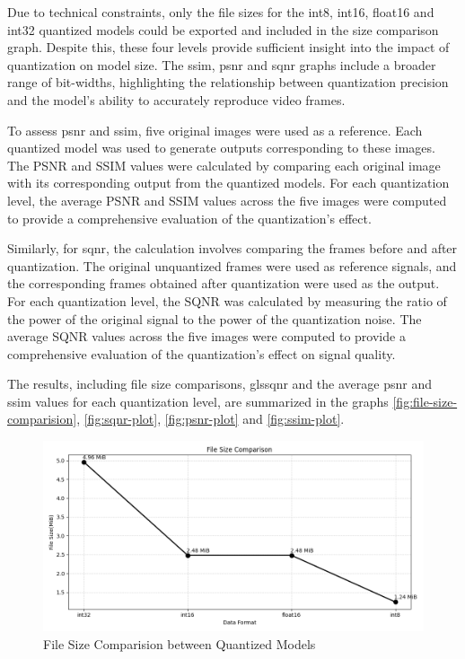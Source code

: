     Due to technical constraints, only the file sizes for the int8, int16, float16 and int32 quantized models could be exported and included in the size comparison graph. Despite this, these four levels provide sufficient insight into the impact of quantization on model size. The \gls{ssim}, \gls{psnr} and \gls{sqnr} graphs include a broader range of bit-widths, highlighting the relationship between quantization precision and the model's ability to accurately reproduce video frames.

    To assess \gls{psnr} and \gls{ssim}, five original images were used as a reference. Each quantized model was used to generate outputs corresponding to these images. The PSNR and SSIM values were calculated by comparing each original image with its corresponding output from the quantized models. For each quantization level, the average PSNR and SSIM values across the five images were computed to provide a comprehensive evaluation of the quantization's effect.

    Similarly, for \gls{sqnr}, the calculation involves comparing the frames before and after quantization. The original unquantized frames were used as reference signals, and the corresponding frames obtained after quantization were used as the output. For each quantization level, the SQNR was calculated by measuring the ratio of the power of the original signal to the power of the quantization noise. The average SQNR values across the five images were computed to provide a comprehensive evaluation of the quantization's effect on signal quality.    

    The results, including file size comparisons, gls{sqnr} and the average \gls{psnr} and \gls{ssim} values for each quantization level, are summarized in the graphs \autoref{fig:file-size-comparision}, \autoref{fig:sqnr-plot}, \autoref{fig:psnr-plot} and \autoref{fig:ssim-plot}.
    
    \begin{figure}[H]
        \centering
        \includegraphics[height=0.4\textwidth]{assets/quantization/size_plot.png}
        \caption{File Size Comparision between Quantized Models}
        \label{fig:file-size-comparision}
    \end{figure}

